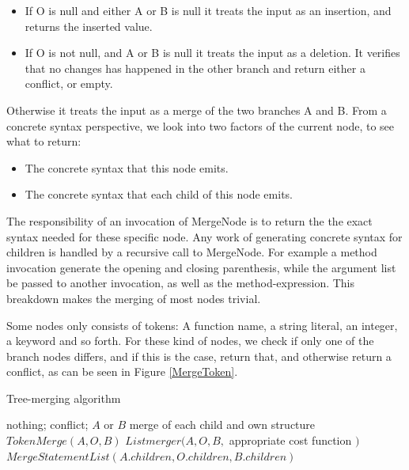 \documentclass[11pt]{article}
\begin{document}
\begin{itemize}
   \item If O is null and either A or B is null it treats the input as an insertion, and returns the inserted value.
   \item If O is not null, and A or B is null it treats the input as a deletion. It verifies that no changes has happened in the other branch and return either a conflict, or empty.
\end{itemize}

Otherwise it treats the input as a merge of the two branches A and B. From a concrete syntax perspective, we look into two factors of the current node, to see what to return:

\begin{itemize}
   \item The concrete syntax that this node emits.
   \item The concrete syntax that each child of this node emits.
\end{itemize}

The responsibility of an invocation of MergeNode is to return the the exact syntax needed for these specific node. Any work of generating concrete syntax for children is handled by a recursive call to MergeNode. For example a method invocation generate the opening and closing parenthesis, while the argument list be passed to another invocation, as well as the method-expression. This breakdown makes the merging of most nodes trivial.

Some nodes only consists of tokens: A function name, a string literal, an integer, a keyword and so forth. For these kind of nodes, we check if only one of the branch nodes differs, and if this is the case, return that, and otherwise return a conflict, as can be seen in Figure \ref{MergeToken}.



\begin{algorithm}
\caption{Tree-merging algorithm}
\label{MergeNode}
\begin{algorithmic}
            \State \Return nothing;
        \Else
            \State \Return conflict;
        \EndIf
    \EndIf
        \State \Return $A$ or $B$
    \EndIf
        \State \Return merge of each child and own structure
    \EndIf
        \State \Return $TokenMerge(A, O, B)$
    \EndIf
        \State \Return $Listmerger(A, O, B, $ appropriate cost function $)$
    \EndIf
        \State \Return $MergeStatementList(A.children, O.children, B.children)$
    \EndIf
\EndFunction
\end{algorithmic}
\end{algorithm}
\end{document}
